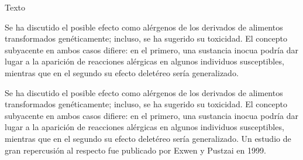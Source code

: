 \documentclass[11pt,twoside]{article}
\begin{document}
\bigskip\bigskip\bigskip


Texto \begin{minipage}[t]{5cm}
Se ha discutido el posible efecto como alérgenos de los derivados de alimentos transformados genéticamente; incluso, se ha sugerido su toxicidad. El concepto subyacente en ambos casos difiere: en el primero, una sustancia inocua podría dar lugar a la aparición de reacciones alérgicas en algunos individuos susceptibles, mientras que en el segundo su efecto deletéreo sería generalizado. 
\end{minipage}
%
\hfill
%
\begin{minipage}[t]{5cm}
\setlength{\fboxsep}{0pt}
\centering
\vspace*{0pt}
\end{minipage}
%


\bigskip
Se ha discutido el posible efecto como alérgenos de los derivados de alimentos transformados genéticamente; incluso, se ha sugerido su toxicidad. El concepto subyacente en ambos casos difiere: en el primero, una sustancia inocua podría dar lugar a la aparición de reacciones alérgicas en algunos individuos susceptibles, mientras que en el segundo su efecto deletéreo sería generalizado. Un estudio de gran repercusión al respecto fue publicado por Exwen y Pustzai en 1999. 
\end{document}
